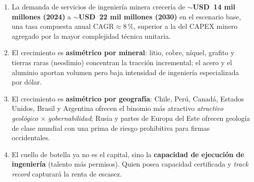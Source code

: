 \documentclass[11pt,letterpaper]{report}
\begin{document}
\begin{cajadato}
\begin{enumerate}[label=\textbf{\arabic*.}]
\item La demanda de servicios de ingeniería minera crecería de \textbf{$\sim$USD~14 mil millones (2024)} a
      \textbf{$\sim$USD~22 mil millones (2030)} en el escenario base, una tasa compuesta anual
      $\mathrm{CAGR}\approx 8\,\%$, superior a la del CAPEX minero agregado por la mayor complejidad técnica unitaria.
\item El crecimiento es \textbf{asimétrico por mineral}: litio, cobre, níquel, grafito y tierras raras (neodimio) concentran la
      tracción incremental; el acero y el aluminio aportan volumen pero baja intensidad de ingeniería especializada por dólar.
\item El crecimiento es \textbf{asimétrico por geografía}: Chile, Perú, Canadá, Estados Unidos, Brasil y Argentina ofrecen el binomio
      más atractivo \emph{atractivo geológico} $\times$ \emph{gobernabilidad}; Rusia y partes de Europa del Este ofrecen geología
      de clase mundial con una prima de riesgo prohibitiva para firmas occidentales.
\item El cuello de botella ya no es el capital, sino la \textbf{capacidad de ejecución de ingeniería} (talento más permisos).
      Quien posea capacidad certificada y \emph{track record} capturará la renta de escasez.
\end{enumerate}
\end{cajadato}
\end{document}
